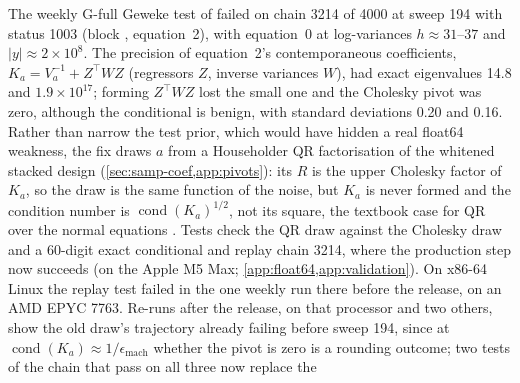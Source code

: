 The weekly G-full Geweke test \citep{geweke2004getting} of  failed on chain 3214 of 4000 at sweep 194 with status 1003 (block , equation~2), with equation~0 at log-variances $h \approx 31$--$37$ and $|y| \approx 2\times10^{8}$. %
The precision of equation~2's contemporaneous coefficients, $K_a = V_a^{-1} + Z^\top W Z$ (regressors $Z$, inverse variances $W$), had exact eigenvalues 14.8 and $1.9\times10^{17}$; forming $Z^\top W Z$ lost the small one and the Cholesky pivot was zero, although the conditional is benign, with standard deviations 0.20 and 0.16. %
Rather than narrow the test prior, which would have hidden a real float64 weakness, the fix draws $a$ from a Householder QR factorisation of the whitened stacked design (\cref{sec:samp-coef,app:pivots}): its $R$ is the upper Cholesky factor of $K_a$, so the draw is the same function of the noise, but $K_a$ is never formed and the condition number is $\operatorname{cond}(K_a)^{1/2}$, not its square, the textbook case for QR over the normal equations \citep{higham2002accuracy,bjorck1996numerical}. %
Tests check the QR draw against the Cholesky draw and a 60-digit exact conditional and replay chain 3214, where the production step now succeeds (on the Apple M5 Max; \cref{app:float64,app:validation}). %
On x86-64 Linux the replay test failed in the one weekly run there before the release, on an AMD EPYC
7763. Re-runs after the release, on that processor and two others, show the old draw's trajectory
already failing before sweep 194, since at $\operatorname{cond}(K_a) \approx 1/\epsilon_{\mathrm{mach}}$
whether the pivot is zero is a rounding outcome; two tests of the chain that pass on all three now replace the
